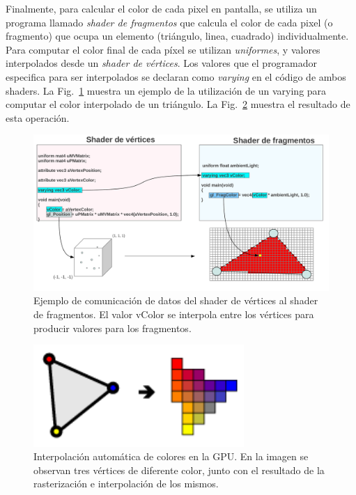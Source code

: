 Finalmente, para calcular el color de cada pixel en pantalla, se utiliza un programa llamado \emph{shader de fragmentos} que calcula el color de cada pixel (o fragmento) que ocupa un elemento (triángulo, linea, cuadrado) individualmente.
Para computar el color final de cada píxel se utilizan \emph{uniformes}, y valores interpolados desde un \emph{shader de vértices}.
Los valores que el programador especifica para ser interpolados se declaran como \emph{varying} en el código de ambos shaders.
La Fig.~\ref{fg:varying} muestra un ejemplo de la utilización de un varying para computar el color interpolado de un triángulo.
La Fig.~\ref{fg:interpolation} muestra el resultado de esta operación.


\begin{figure}[h]
\begin{center}
\includegraphics[width=13cm]{figures/varying}
\end{center}
\caption{Ejemplo de comunicación de datos del shader de vértices al shader de fragmentos. El valor vColor se interpola entre los vértices para producir valores para los fragmentos.}
\label{fg:varying}
\end{figure}

\begin{figure}[h]
\begin{center}
\includegraphics[width=8cm]{figures/interpolation}
\end{center}
\caption[Interpolación automática de colores en la GPU.]{Interpolación automática de colores en la GPU. En la imagen se observan tres vértices de diferente color, junto con el resultado de la rasterización e interpolación de los mismos.}
\label{fg:interpolation}
\end{figure}

